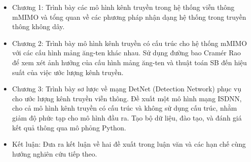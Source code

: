\renewcommand{\labelitemi}{$-$}
\begin{itemize}
	\item Chương 1: Trình bày các mô hình kênh truyền trong hệ thống viễn thông mMIMO và tổng quan về các phương pháp nhận dạng hệ thống trong truyền thông không dây.
    \item Chương 2: Trình bày mô hình kênh truyền có cấu trúc cho hệ thống mMIMO với các cấu hình mảng ăng-ten khác nhau. Sử dụng đường bao Cramér Rao  để xem xét ảnh hưởng của cấu hình mảng ăng-ten và thuật toán SB đến hiệu suất của việc ước lượng kênh truyền.
	\item Chương 3: Trình bày sơ lược về mạng DetNet (Detection Network) phục vụ cho ước lượng kênh truyền viễn thông. Đề xuất một mô hình mạng ISDNN, cho cả mô hình kênh truyền có cấu trúc và không sử dụng cấu trúc, nhằm giảm độ phức tạp cho mô hình đầu ra. Tạo bộ dữ liệu, đào tạo, và đánh giá kết quả thông qua mô phỏng Python.
	\item Kết luận: Đưa ra kết luận về hai đề xuất trong luận văn và các hạn chế cùng hướng nghiên cứu tiếp theo.
\end{itemize} 